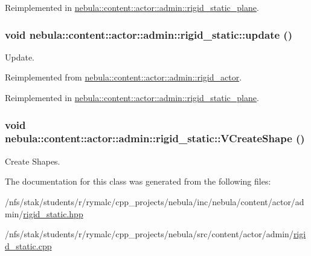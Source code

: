 Reimplemented in \hyperlink{classnebula_1_1content_1_1actor_1_1admin_1_1rigid__static__plane_af1c2da35d02592bf5cad8823775bb2d7}{nebula::content::actor::admin::rigid\_\-static\_\-plane}.\hypertarget{classnebula_1_1content_1_1actor_1_1admin_1_1rigid__static_af7ecdabc256260e8ae07436b3bc4854f}{
\subsubsection[{update}]{\setlength{\rightskip}{0pt plus 5cm}void nebula::content::actor::admin::rigid\_\-static::update ()}}
\label{classnebula_1_1content_1_1actor_1_1admin_1_1rigid__static_af7ecdabc256260e8ae07436b3bc4854f}


Update. 

Reimplemented from \hyperlink{classnebula_1_1content_1_1actor_1_1admin_1_1rigid__actor_a3c0adb150e7bfb43c209e6dc102253a5}{nebula::content::actor::admin::rigid\_\-actor}.

Reimplemented in \hyperlink{classnebula_1_1content_1_1actor_1_1admin_1_1rigid__static__plane_ad14b9160b7c1aa9ae29d52141d1b6221}{nebula::content::actor::admin::rigid\_\-static\_\-plane}.\hypertarget{classnebula_1_1content_1_1actor_1_1admin_1_1rigid__static_a36052763ad8963027547e7d0bd479849}{
\subsubsection[{VCreateShape}]{\setlength{\rightskip}{0pt plus 5cm}void nebula::content::actor::admin::rigid\_\-static::VCreateShape ()}}
\label{classnebula_1_1content_1_1actor_1_1admin_1_1rigid__static_a36052763ad8963027547e7d0bd479849}


Create Shapes. 

The documentation for this class was generated from the following files:\begin{DoxyCompactItemize}
\item 
/nfs/stak/students/r/rymalc/cpp\_\-projects/nebula/inc/nebula/content/actor/admin/\hyperlink{admin_2rigid__static_8hpp}{rigid\_\-static.hpp}\item 
/nfs/stak/students/r/rymalc/cpp\_\-projects/nebula/src/content/actor/admin/\hyperlink{admin_2rigid__static_8cpp}{rigid\_\-static.cpp}\end{DoxyCompactItemize}
